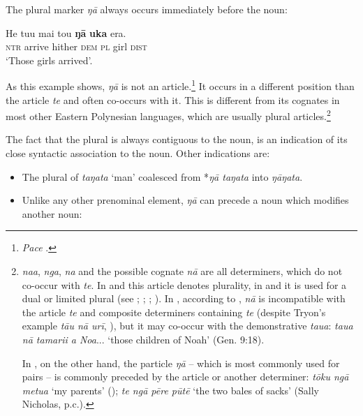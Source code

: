The plural marker \textit{ŋā} always occurs immediately before the noun: 

\ea\label{ex:5.75}
\gll He tu{\ꞌ}u mai tou \textbf{ŋā} \textbf{uka} era. \\
\textsc{ntr} arrive hither \textsc{dem} \textsc{pl} girl \textsc{dist} \\

\glt
‘Those girls arrived’. \textstyleExampleref{[Blx-3.053]}
\z

As this example shows, \textit{ŋā} is not an article.\footnote{\label{fn:260}\textit{Pace} \citet[474]{DuFeu1987}.} It occurs in a different position than the article \textit{te} and often co-occurs with it. This is different from its cognates in most other Eastern Polynesian languages, which are usually plural articles.\footnote{\label{fn:261} \textit{naa},  \textit{nga},  \textit{na} and the possible cognate  \textit{nā} are all determiners, which do not co-occur with \textit{te}. In  and  this article denotes plurality, in  and  it is used for a dual or limited plural (see \citealt[19]{Elbert1976}; \citealt[20]{Biggs1973}; \citealt[11]{Zewen1987}; \citealt[16]{AcadémieTahitienne1986}). In , according to \citet[18]{AcadémieTahitienne1986}, \textit{nā} is incompatible with the article \textit{te} and composite determiners containing \textit{te} (despite Tryon’s example \textit{tā{\ꞌ}u nā {\ꞌ}urī}, \citet[17]{Tryon1970}), but it may co-occur with the demonstrative \textit{taua}: \textit{taua nā tamari{\ꞌ}i a Noa}... ‘those children of Noah’ (Gen. 9:18).

In , on the other hand, the particle \textit{ŋā} – which is most commonly used for pairs – is commonly preceded by the article or another determiner: \textit{tōku ngā metua} ‘my parents’ (\citealt[405–406]{Buse1963Nominal}); \textit{te ngā pēre pūtē} ‘the two bales of sacks’ (Sally Nicholas, p.c.).}  

The fact that the plural is always contiguous to the noun, is an indication of its close syntactic association to the noun. Other indications are:

\begin{itemize}
\item 
The plural of \textit{taŋata} ‘man’ coalesced from *\textit{ŋā taŋata} into \textit{ŋāŋata}. 

\item 
Unlike any other prenominal element, \textit{ŋā} can precede a noun which modifies another noun:

\end{itemize}

